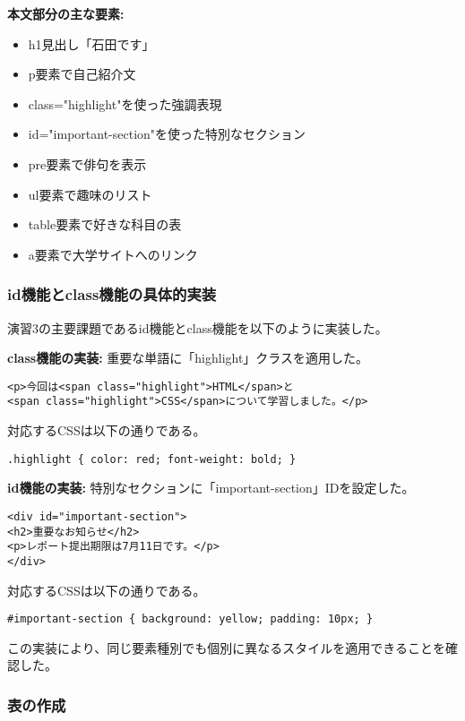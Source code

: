 \documentclass[12pt,a4j]{jarticle}
\begin{document}
\vspace{0.5em}
\noindent\textbf{本文部分の主な要素:}
\begin{itemize}
\item h1見出し「石田です」
\item p要素で自己紹介文
\item class="highlight"を使った強調表現
\item id="important-section"を使った特別なセクション
\item pre要素で俳句を表示
\item ul要素で趣味のリスト
\item table要素で好きな科目の表
\item a要素で大学サイトへのリンク
\end{itemize}

\subsubsection{id機能とclass機能の具体的実装}

演習3の主要課題であるid機能とclass機能を以下のように実装した。

\textbf{class機能の実装:}
重要な単語に「highlight」クラスを適用した。
\begin{verbatim}
<p>今回は<span class="highlight">HTML</span>と
<span class="highlight">CSS</span>について学習しました。</p>
\end{verbatim}

対応するCSSは以下の通りである。
\begin{verbatim}
.highlight { color: red; font-weight: bold; }
\end{verbatim}

\textbf{id機能の実装:}
特別なセクションに「important-section」IDを設定した。
\begin{verbatim}
<div id="important-section">
<h2>重要なお知らせ</h2>
<p>レポート提出期限は7月11日です。</p>
</div>
\end{verbatim}

対応するCSSは以下の通りである。
\begin{verbatim}
#important-section { background: yellow; padding: 10px; }
\end{verbatim}

この実装により、同じ要素種別でも個別に異なるスタイルを適用できることを確認した。

\subsubsection{表の作成}
\end{document}
